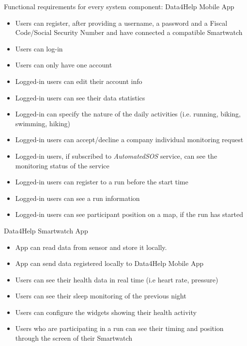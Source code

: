 Functional requirements for every system component:
\newline
Data4Help Mobile App
\begin{itemize}
    \item Users can register, after providing a username, a password and a Fiscal Code/Social Security Number and have connected a compatible Smartwatch
    \item Users can log-in
    \item Users can only have one account
    \item Logged-in users can edit their account info
    \item Logged-in users can see their data statistics
    \item Logged-in can specify the nature of the daily activities (i.e. running, biking, swimming, hiking)
    \item Logged-in users can accept/decline a company individual monitoring request
    \item Logged-in users, if subscribed to \textit{AutomatedSOS} service, can see the monitoring status of the service
    \item Logged-in users can register to a run before the start time
    \item Logged-in users can see a run information
    \item Logged-in users can see participant position on a map, if the run has started
\end{itemize}

\noindent Data4Help Smartwatch App
\begin{itemize}
    \item App can read data from sensor and store it locally.
    \item App can send data registered locally to Data4Help Mobile App
    \item Users can see their health data in real time (i.e heart rate, pressure)
    \item Users can see their sleep monitoring of the previous night
    \item Users can configure the widgets showing their health activity
    \item Users who are participating in a run can see their timing and position through the screen of their Smartwatch
    
\end{itemize}

